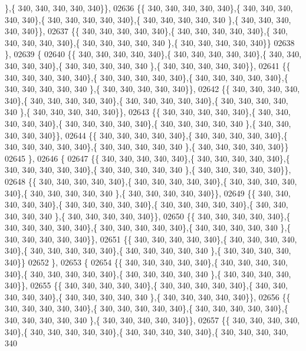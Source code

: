 \begin{DoxyCode}
      \},\{ 340, 340, 340, 340, 340\}\},
02636 \{\{ 340, 340, 340, 340, 340\},\{ 340, 340, 340, 340, 340\},\{ 340, 340, 340, 340, 340\},\{ 340, 340, 340, 340, 340
      \},\{ 340, 340, 340, 340, 340\}\},
02637 \{\{ 340, 340, 340, 340, 340\},\{ 340, 340, 340, 340, 340\},\{ 340, 340, 340, 340, 340\},\{ 340, 340, 340, 340, 340
      \},\{ 340, 340, 340, 340, 340\}\}
02638 \},
02639 \{
02640 \{\{ 340, 340, 340, 340, 340\},\{ 340, 340, 340, 340, 340\},\{ 340, 340, 340, 340, 340\},\{ 340, 340, 340, 340, 340
      \},\{ 340, 340, 340, 340, 340\}\},
02641 \{\{ 340, 340, 340, 340, 340\},\{ 340, 340, 340, 340, 340\},\{ 340, 340, 340, 340, 340\},\{ 340, 340, 340, 340, 340
      \},\{ 340, 340, 340, 340, 340\}\},
02642 \{\{ 340, 340, 340, 340, 340\},\{ 340, 340, 340, 340, 340\},\{ 340, 340, 340, 340, 340\},\{ 340, 340, 340, 340, 340
      \},\{ 340, 340, 340, 340, 340\}\},
02643 \{\{ 340, 340, 340, 340, 340\},\{ 340, 340, 340, 340, 340\},\{ 340, 340, 340, 340, 340\},\{ 340, 340, 340, 340, 340
      \},\{ 340, 340, 340, 340, 340\}\},
02644 \{\{ 340, 340, 340, 340, 340\},\{ 340, 340, 340, 340, 340\},\{ 340, 340, 340, 340, 340\},\{ 340, 340, 340, 340, 340
      \},\{ 340, 340, 340, 340, 340\}\}
02645 \},
02646 \{
02647 \{\{ 340, 340, 340, 340, 340\},\{ 340, 340, 340, 340, 340\},\{ 340, 340, 340, 340, 340\},\{ 340, 340, 340, 340, 340
      \},\{ 340, 340, 340, 340, 340\}\},
02648 \{\{ 340, 340, 340, 340, 340\},\{ 340, 340, 340, 340, 340\},\{ 340, 340, 340, 340, 340\},\{ 340, 340, 340, 340, 340
      \},\{ 340, 340, 340, 340, 340\}\},
02649 \{\{ 340, 340, 340, 340, 340\},\{ 340, 340, 340, 340, 340\},\{ 340, 340, 340, 340, 340\},\{ 340, 340, 340, 340, 340
      \},\{ 340, 340, 340, 340, 340\}\},
02650 \{\{ 340, 340, 340, 340, 340\},\{ 340, 340, 340, 340, 340\},\{ 340, 340, 340, 340, 340\},\{ 340, 340, 340, 340, 340
      \},\{ 340, 340, 340, 340, 340\}\},
02651 \{\{ 340, 340, 340, 340, 340\},\{ 340, 340, 340, 340, 340\},\{ 340, 340, 340, 340, 340\},\{ 340, 340, 340, 340, 340
      \},\{ 340, 340, 340, 340, 340\}\}
02652 \},
02653 \{
02654 \{\{ 340, 340, 340, 340, 340\},\{ 340, 340, 340, 340, 340\},\{ 340, 340, 340, 340, 340\},\{ 340, 340, 340, 340, 340
      \},\{ 340, 340, 340, 340, 340\}\},
02655 \{\{ 340, 340, 340, 340, 340\},\{ 340, 340, 340, 340, 340\},\{ 340, 340, 340, 340, 340\},\{ 340, 340, 340, 340, 340
      \},\{ 340, 340, 340, 340, 340\}\},
02656 \{\{ 340, 340, 340, 340, 340\},\{ 340, 340, 340, 340, 340\},\{ 340, 340, 340, 340, 340\},\{ 340, 340, 340, 340, 340
      \},\{ 340, 340, 340, 340, 340\}\},
02657 \{\{ 340, 340, 340, 340, 340\},\{ 340, 340, 340, 340, 340\},\{ 340, 340, 340, 340, 340\},\{ 340, 340, 340, 340, 340

\end{DoxyCode}
